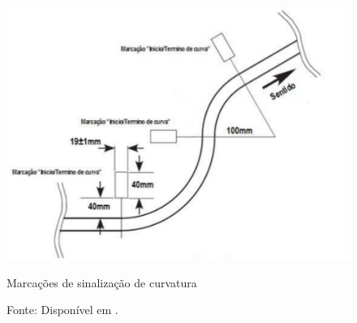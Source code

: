 \begin{figure}[t!]
 \centering
 \captionsetup{width=0.68\textwidth,font=footnotesize,textfont=bf}
 \includegraphics[scale=0.6]{figuras/Percurso4.png}
 \caption{Marcações de sinalização de curvatura \label{fig:percurso4}}
 \vspace{-0.3cm}
 \caption*{Fonte: Disponível em \cite[p.4]{RegrasRobocore}.}
\end{figure}


















